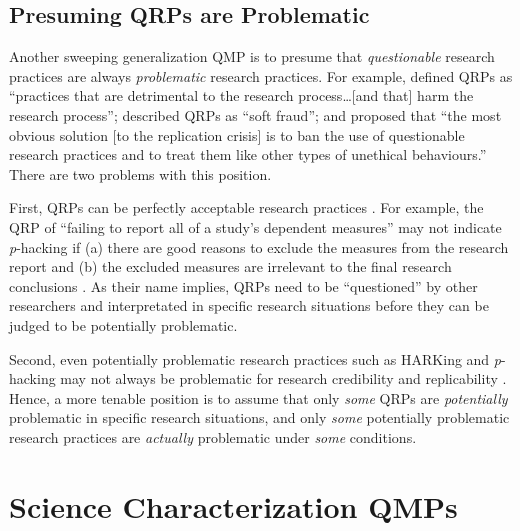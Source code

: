 \documentclass[authordate, meta, issue]{jote-new-article}
\begin{document}
\subsection{Presuming QRPs are Problematic}



Another sweeping generalization QMP is to presume that \emph{questionable} research practices are always \emph{problematic} research practices. For example, \textcite[p. 1]{Hartgerink2016} defined QRPs as “practices that are detrimental to the research process…[and that] harm the research process”; \textcite{Chambers2014} described QRPs as “soft fraud”; and \textcite[p. 372]{Schimmack2020} proposed that “the most obvious solution [to the replication crisis] is to ban the use of questionable research practices and to treat them like other types of unethical behaviours.” There are two problems with this position.



First, QRPs can be perfectly acceptable research practices \parencites{Fiedler2016}[Table 6]{Moran2022}[p. 551]{Rubin2022}{Sacco2019}. For example, the QRP of “failing to report all of a study’s dependent measures” \parencites[p. 525]{John2012} may not indicate \emph{p}-hacking if (a) there are good reasons to exclude the measures from the research report and (b) the excluded measures are irrelevant to the final research conclusions \parencites[p. 46]{Fiedler2016}[p. 531]{John2012}{Rubin2017b}{Rubin2020}. As their name implies, QRPs need to be “questioned” by other researchers and interpretated in specific research situations before they can be judged to be potentially problematic.



Second, even potentially problematic research practices such as HARKing and \emph{p}-hacking may not always be problematic for research credibility and replicability \parencites[e.g.,][]{Bak-Coleman2022}{Devezer2019}{Fanelli2018}{Leung2011}{Rubin2017a}{Rubin2017b}{Rubin2020}{Rubin2022}{Stanley2018}{Ulrich2020}{Vancouver2018}. Hence, a more tenable position is to assume that only \emph{some} QRPs are \emph{potentially} problematic in specific research situations, and only \emph{some} potentially problematic research practices are \emph{actually} problematic under \emph{some} conditions.



\section{Science Characterization QMPs}
\end{document}
